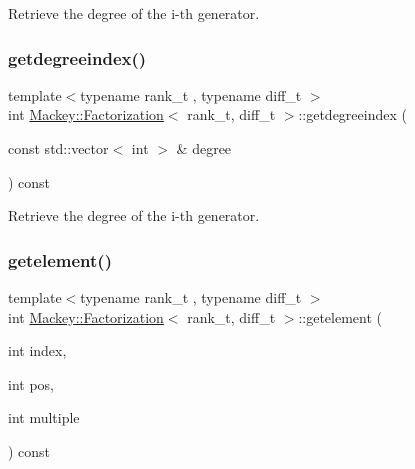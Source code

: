 Retrieve the degree of the i-\/th generator. 

\mbox{\label{classMackey_1_1Factorization_ab90f461af3418417970d4be8682e965d}} 
\subsubsection{\texorpdfstring{getdegreeindex()}{getdegreeindex()}}
{\footnotesize\ttfamily template$<$typename rank\+\_\+t , typename diff\+\_\+t $>$ \\
int \hyperlink{classMackey_1_1Factorization}{Mackey\+::\+Factorization}$<$ rank\+\_\+t, diff\+\_\+t $>$\+::getdegreeindex (\begin{DoxyParamCaption}\item[{const std\+::vector$<$ int $>$ \&}]{degree }\end{DoxyParamCaption}) const\hspace{0.3cm}{\ttfamily [inline]}}



Retrieve the degree of the i-\/th generator. 

\mbox{\label{classMackey_1_1Factorization_ac412da750df7b3b35ca87c3b694fd732}} 
\subsubsection{\texorpdfstring{getelement()}{getelement()}}
{\footnotesize\ttfamily template$<$typename rank\+\_\+t , typename diff\+\_\+t $>$ \\
int \hyperlink{classMackey_1_1Factorization}{Mackey\+::\+Factorization}$<$ rank\+\_\+t, diff\+\_\+t $>$\+::getelement (\begin{DoxyParamCaption}\item[{int}]{index,  }\item[{int}]{pos,  }\item[{int}]{multiple }\end{DoxyParamCaption}) const\hspace{0.3cm}{\ttfamily [inline]}}



